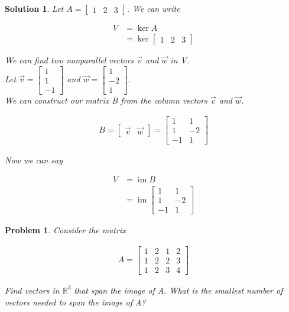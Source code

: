 \documentclass{article}
\newtheorem{problem}{Problem}
\newtheorem*{solution}{Solution}
\DeclareMathOperator{\im}{im}
\begin{document}
\begin{solution}
Let $A = \begin{bmatrix} 1 & 2 & 3 \end{bmatrix}$. We can write 

\begin{align*}
V &= \ker A \\ &= \ker \begin{bmatrix} 1 & 2 & 3 \end{bmatrix}
\end{align*}

We can find two nonparallel vectors $\vec{v}$ and $\vec{w}$ in V. \\

Let $\vec{v} = \begin{bmatrix} 1 \\ 1 \\ -1 \end{bmatrix}$ and $\vec{w} = \begin{bmatrix} 1 \\ -2 \\ 1 \end{bmatrix}$. \\

We can construct our matrix B from the column vectors $\vec{v}$ and $\vec{w}$.

\begin{align*}
B = \begin{bmatrix} \vec{v} & \vec{w} \end{bmatrix} = \begin{bmatrix} 1 & 1 \\ 1 & -2 \\ -1 & 1 \end{bmatrix} 
\end{align*}

Now we can say 

\begin{align*}
V &= \im B \\ &= \im \begin{bmatrix} 1 & 1 \\ 1 & -2 \\ -1 & 1 \end{bmatrix} 
\end{align*}

\end{solution}

\begin{problem}
Consider the matrix

\begin{align*}
A = \begin{bmatrix} 1 & 2 & 1 & 2 \\ 1 & 2 & 2 & 3 \\ 1 & 2 & 3 & 4 \end{bmatrix}
\end{align*}

Find vectors in $\mathbb{R}^3$ that span the image of A. What is the smallest number of vectors needed to span the image of A?
\end{problem}
\end{document}

